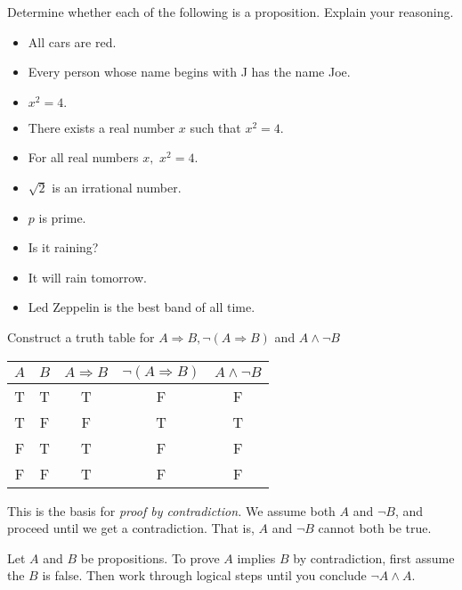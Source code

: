\documentclass{ximera}
\begin{document}
\begin{br}
  Determine whether each of the following is a proposition. Explain your reasoning.

  \begin{itemize}
    \item All cars are red.
    \item Every person whose name begins with J has the name Joe.
    \item $x^2=4.$
    \item There exists a real number $x$ such that $x^2=4$.
    \item For all real numbers $x,$ $x^2=4.$
    \item $\sqrt{2}$ is an irrational number.
    \item $p$ is prime.
    \item Is it raining?
    \item It will rain tomorrow.
    \item Led Zeppelin is the best band of all time.
  \end{itemize}
\end{br}



\begin{br}
  Construct a truth table for $A\Rightarrow B, \neg (A\Rightarrow B)$ and $A\land \neg B$

  \begin{solution}
 
    \begin{tabular}{c|c|c|c|c}
      $A$ 	& $B$	& $A\Rightarrow B$ 	& $\neg (A\Rightarrow B)$ & $A\land \neg B$\\\hline
      T 	& T		& T 				& F					& F	\\
      T 	& F 		& F 				& T					& T\\
      F 	& T 		& T 				& F					& F\\
      F 	& F 		& T 				& F					& F\\
    \end{tabular}
  \end{solution}
\end{br}
This is the basis for \emph{proof by contradiction.} We assume both $A$ and $\neg B$, and proceed until we get a contradiction. That is, $A$ and $\neg B$ cannot both be true.

\begin{defn}\label{proof-contradiction}
  Let $A$ and $B$ be propositions. To prove $A$ implies $B$ by contradiction, first assume the $B$ is false. Then work through logical steps until you conclude $\neg A \land A$.
\end{defn}
\end{document}
